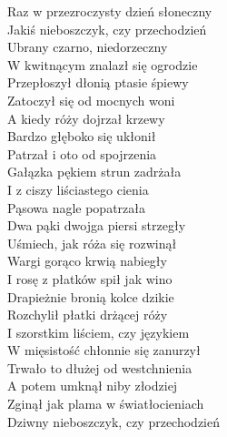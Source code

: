 
\begin{flushleft}
Raz w przezroczysty dzień słoneczny  \\
Jakiś nieboszczyk, czy przechodzień  \\
Ubrany czarno, niedorzeczny \tab{}\\
W kwitnącym znalazł się ogrodzie \\
Przepłoszył dłonią ptasie śpiewy  \\
Zatoczył się od mocnych woni \tab{} \\
A kiedy róży dojrzał krzewy \tab{} \\
Bardzo głęboko się ukłonił \tab{} \\
\vskip 3mm
Patrzał i oto od spojrzenia \\
Gałązka pękiem strun zadrżała \\
I z ciszy liściastego cienia \\
Pąsowa nagle popatrzała \\
Dwa pąki dwojga piersi strzegły \\
Uśmiech, jak róża się rozwinął \\
Wargi gorąco krwią nabiegły \\
I rosę z płatków spił jak wino \\
\vskip 3mm
Drapieżnie bronią kolce dzikie \\
Rozchylił płatki drżącej róży \\
I szorstkim liściem, czy językiem  \\
W mięsistość chłonnie się zanurzył \\
Trwało to dłużej od westchnienia  \\
A potem umknął niby złodziej \\
Zginął jak plama w światłocieniach  \\
Dziwny nieboszczyk, czy przechodzień \\
\end{flushleft}
\clearpage